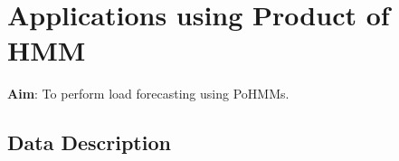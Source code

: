 \documentclass{sig-alternate}
\begin{document}


\section{Applications using Product of HMM}
\label{poc}

\textbf{Aim}: To perform load forecasting using PoHMMs.

\subsection{Data Description} 
\end{document}
